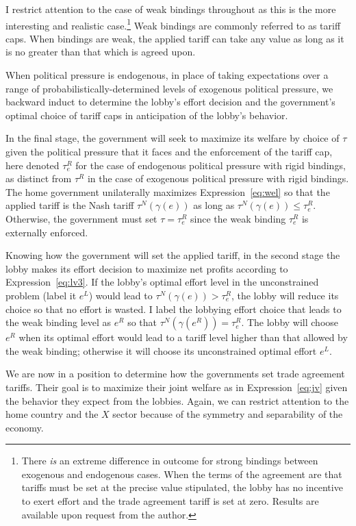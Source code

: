 \documentclass[12pt,titlepage]{article}
\newcommand{\ga}{\gamma}
\begin{document}
I restrict attention to the case of weak bindings throughout as this is the more interesting and realistic case.\footnote{There \textit{is} an extreme difference in outcome for strong bindings between exogenous and endogenous cases. When the terms of the agreement are that tariffs must be set at the precise value stipulated, the lobby has no incentive to exert effort and the trade agreement tariff is set at zero. Results are available upon request from the author.} Weak bindings are commonly referred to as tariff caps. When bindings are weak, the applied tariff can take any value as long as it is no greater than that which is agreed upon.

When political pressure is endogenous, in place of taking expectations over a range of probabilistically-determined levels of exogenous political pressure, we backward induct to determine the lobby's effort decision and the government's optimal choice of tariff caps in anticipation of the lobby's behavior.

In the final stage, the government will seek to maximize its welfare by choice of $\tau$ given the political pressure that it faces and the enforcement of the tariff cap, here denoted $\tau_e^R$ for the case of endogenous political pressure with rigid bindings, as distinct from $\tau^R$ in the case of exogenous political pressure with rigid bindings. The home government unilaterally maximizes Expression~\ref{eq:wel} so that the applied tariff is the Nash tariff $\tau^N(\ga(e))$ as long as $\tau^N(\ga(e)) \leq \tau_e^R$. Otherwise, the government must set $\tau = \tau_e^R$ since the weak binding $\tau_e^R$ is externally enforced.

Knowing how the government will set the applied tariff, in the second stage the lobby makes its effort decision to maximize net profits according to Expression~\ref{eq:lv3}. If the lobby's optimal effort level in the unconstrained problem (label it $e^L$) would lead to $\tau^N(\ga(e)) > \tau_e^R$, the lobby will reduce its choice so that no effort is wasted. I label the lobbying effort choice that leads to the weak binding level as $e^R$ so that $\tau^N(\ga(e^R)) = \tau_e^R$. The lobby will choose $e^R$ when its optimal effort would lead to a tariff level higher than that allowed by the weak binding; otherwise it will choose its unconstrained optimal effort $e^L$. 

We are now in a position to determine how the governments set trade agreement tariffs. Their goal is to maximize their joint welfare as in Expression~\ref{eq:jv} given the behavior they expect from the lobbies. Again, we can restrict attention to the home country and the $X$ sector because of the symmetry and separability of the economy.
\end{document}
